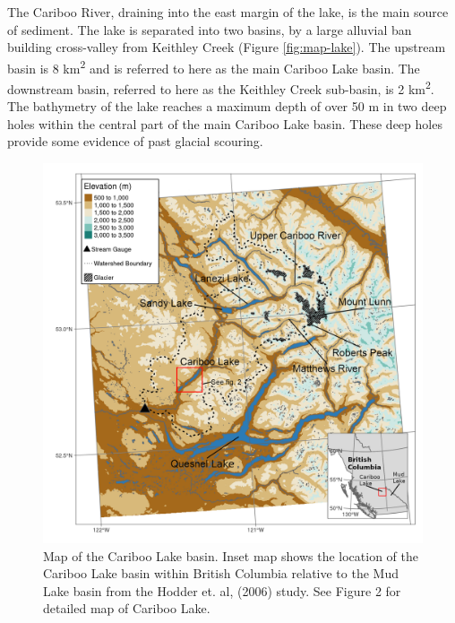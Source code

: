 \documentclass[Royal,times,doublespace,sageh]{sagej}
\begin{document}
The Cariboo River, draining into the east margin of the lake, is the
main source of sediment. The lake is separated into two basins, by a
large alluvial ban building cross-valley from Keithley Creek (Figure
\ref{fig:map-lake}). The upstream basin is 8 km\textsuperscript{2} and
is referred to here as the main Cariboo Lake basin. The downstream
basin, referred to here as the Keithley Creek sub-basin, is 2
km\textsuperscript{2}. The bathymetry of the lake reaches a maximum
depth of over 50 m in two deep holes within the central part of the main
Cariboo Lake basin. These deep holes provide some evidence of past
glacial scouring.

\begin{figure}

{\centering \includegraphics[width=1\linewidth]{../figs/maps/cl_small_scale_inset_labels_gimp} 

}

\caption{Map of the Cariboo Lake basin. Inset map shows the location of the Cariboo Lake basin within British Columbia relative to the Mud Lake basin from the Hodder et. al, (2006) study. See Figure 2 for detailed map of Cariboo Lake.\label{fig:map-basin}}\label{fig:map-basin}
\end{figure}
\end{document}
